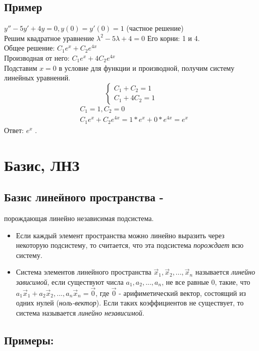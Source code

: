 \documentclass[12pt]{article}
\begin{document}
\subsection{Пример}
$y''-5y'+4y=0, y(0)=y'(0) = 1$ (частное решение)
\\
Решим квадратное уравнение $\lambda^2-5\lambda+4=0$
Его корни: 1 и 4.
\\
Общее решение: $C_1e^x+C_2e^{4x}$
\\
Производная от него:  $C_1e^x+4C_2e^{4x}$
\\
Подставим $x = 0$ в условие для функции и производной, получим систему линейных уравнений.
\[
    \begin{cases}
        C_1+C_2=1 \\
        C_1+4C_2=1
    \end{cases}
\]
\begin{align*}
     & C_1 = 1, C_2 = 0                        \\
     & C_1e^x+C_2e^{4x} = 1*e^x+0*e^{4x} = e^x
\end{align*}
Ответ: $e^x$ .

\setcounter{section}{32}
\section{Базис, ЛНЗ}
\subsection{Базис линейного пространства -} порождающая линейно независимая подсистема.

\begin{itemize}
    \item Если каждый элемент пространства можно линейно выразить через некоторую подсистему, то считается, что эта подсистема \textit{порождает} всю систему.

    \item Система элементов линейного пространства $\vec x_{1}, \vec x_{2}, ..., \vec x_{n}$ называется \textit{линейно зависимой}, если существуют числа $a_{1}, a_{2},..., a_{n}$, не все равные 0, такие, что $a_{1}\vec x_{1} + a_{2}\vec x_{2},..., a_{n}\vec x_{n} = \vec 0$, где $\vec 0$ - арифиметический вектор, состоящий из одних нулей (\textit{ноль-вектор}). Если таких коэффициентов не существует, то система называется \textit{линейно независимой}.

\end{itemize}
\subsection{Примеры:}
\end{document}
